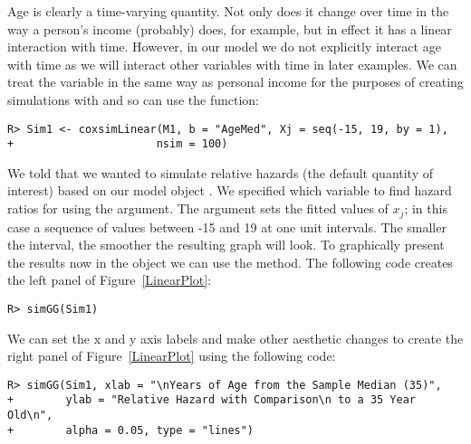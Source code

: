 \documentclass[nojss]{jss}\usepackage[]{graphicx}\usepackage[]{color}
\makeatletter
\newenvironment{kframe}{%
 \def\at@end@of@kframe{}%
 \ifinner\ifhmode%
  \def\at@end@of@kframe{\end{minipage}}%
  \begin{minipage}{\columnwidth}%
 \fi\fi%
 \def\FrameCommand##1{\hskip\@totalleftmargin \hskip-\fboxsep
 \colorbox{shadecolor}{##1}\hskip-\fboxsep
     \hskip-\linewidth \hskip-\@totalleftmargin \hskip\columnwidth}%
 \MakeFramed {\advance\hsize-\width
   \@totalleftmargin\z@ \linewidth\hsize
   \@setminipage}}%
 {\par\unskip\endMakeFramed%
 \at@end@of@kframe}
\newenvironment{knitrout}{}{} %
\makeatother
\begin{document}
Age is clearly a time-varying quantity. Not only does it change over time in the way a person's income (probably) does, for example, but in effect it has a linear interaction with time. However, in our model we do not explicitly interact age with time as we will interact other variables with time in later examples. We can treat the variable in the same way as personal income for the purposes of creating simulations with  and so can use the  function:

\begin{knitrout}
\color{fgcolor}\begin{kframe}
\begin{verbatim}
R> Sim1 <- coxsimLinear(M1, b = "AgeMed", Xj = seq(-15, 19, by = 1),
+                      nsim = 100)
\end{verbatim}
\end{kframe}
\end{knitrout}

We told  that we wanted to simulate relative hazards (the default quantity of interest) based on our model object . We specified which variable to find hazard ratios for using the  argument. The  argument sets the fitted values of $x_{j}$; in this case a sequence of values between -15 and 19 at one unit intervals. The smaller the interval, the smoother the resulting graph will look. To graphically present the results now in the  object we can use the  method. The following code creates the left panel of Figure~\ref{LinearPlot}:

\begin{knitrout}
\color{fgcolor}\begin{kframe}
\begin{verbatim}
R> simGG(Sim1)
\end{verbatim}
\end{kframe}
\end{knitrout}

We can set the x and y axis labels and make other aesthetic changes to create the right panel of Figure~\ref{LinearPlot} using the following code:

\begin{knitrout}
\color{fgcolor}\begin{kframe}
\begin{verbatim}
R> simGG(Sim1, xlab = "\nYears of Age from the Sample Median (35)",
+        ylab = "Relative Hazard with Comparison\n to a 35 Year Old\n",
+        alpha = 0.05, type = "lines")
\end{verbatim}
\end{kframe}
\end{knitrout}
\end{document}

